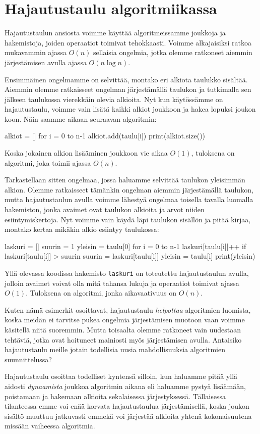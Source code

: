 \section{Hajautustaulu algoritmiikassa}

Hajautustaulun ansiosta voimme käyttää algoritmeissamme
joukkoja ja hakemistoja, joiden operaatiot toimivat tehokkaasti.
Voimme alkajaisiksi ratkoa mukavammin ajassa $O(n)$ sellaisia ongelmia,
jotka olemme ratkoneet aiemmin järjestämisen avulla ajassa $O(n \log n)$.

Ensimmäinen ongelmamme on selvittää,
montako eri alkiota taulukko sisältää.
Aiemmin olemme ratkaisseet ongelman
järjestämällä taulukon ja tutkimalla sen jälkeen
taulukossa vierekkäin olevia alkioita.
Nyt kun käytös\-sämme on hajautustaulu, voimme vain lisätä
kaikki alkiot joukkoon ja hakea lopuksi joukon koon.
Näin saamme aikaan seuraavan algoritmin:

\begin{code}
alkiot = []
for i = 0 to n-1
    alkiot.add(taulu[i])
print(alkiot.size())
\end{code}

Koska jokainen alkion lisääminen joukkoon vie aikaa $O(1)$,
tuloksena on algoritmi, joka toimii ajassa $O(n)$.

Tarkastellaan sitten ongelmaa, jossa haluamme selvittää
taulukon yleisimmän alkion.
Olemme ratkaisseet tämänkin ongelman aiemmin
järjestä\-mällä taulukon, mutta
hajautustaulun avulla voimme lähestyä ongelmaa
toisella tavalla luomalla hakemiston,
jonka avaimet ovat taulukon alkioita ja arvot niiden
esiintymiskertoja.
Nyt voimme vain käydä läpi taulukon sisällön ja
pitää kirjaa, montako kertaa mikäkin alkio esiintyy taulukossa:

\begin{code}
laskuri = []
suurin = 1
yleisin = taulu[0]
for i = 0 to n-1
    laskuri[taulu[i]]++
    if laskuri[taulu[i]] > suurin
        suurin = laskuri[taulu[i]]
        yleisin = taulu[i]
print(yleisin)
\end{code}

Yllä olevassa koodissa hakemisto \texttt{laskuri}
on toteutettu hajautustaulun avulla,
jolloin avaimet voivat olla mitä tahansa lukuja
ja operaatiot toimivat ajassa $O(1)$.
Tuloksena on algoritmi, jonka aikavaativuus on $O(n)$.

Kuten nämä esimerkit osoittavat, hajautustaulu
\emph{helpottaa} algoritmien luomista,
koska meidän ei tarvitse pukea ongelmia järjestämisen muotoon
vaan voimme käsitellä niitä suoremmin.
Mutta toisaalta olemme ratkoneet vain uudestaan tehtäviä,
jotka ovat hoituneet mainiosti myös järjestämisen avulla.
Antaisiko hajautustaulu meille jotain todellisia uusia
mahdollisuuksia algoritmien suunnittelussa?

Hajautustaulu osoittaa todelliset kyntensä silloin,
kun haluamme pitää yllä aidosti \emph{dynaamista}
joukkoa algoritmin aikana eli haluamme pystyä
lisää\-mään, poistamaan ja hakemaan alkioita sekalaisessa järjestyksessä.
Tällai\-sessa tilanteessa emme voi enää korvata hajautustaulua
järjestämisellä, koska joukon sisältö muuttuu jatkuvasti
emmekä voi järjestää alkioita yhtenä kokonaisuutena
missään vaiheessa algoritmia.
